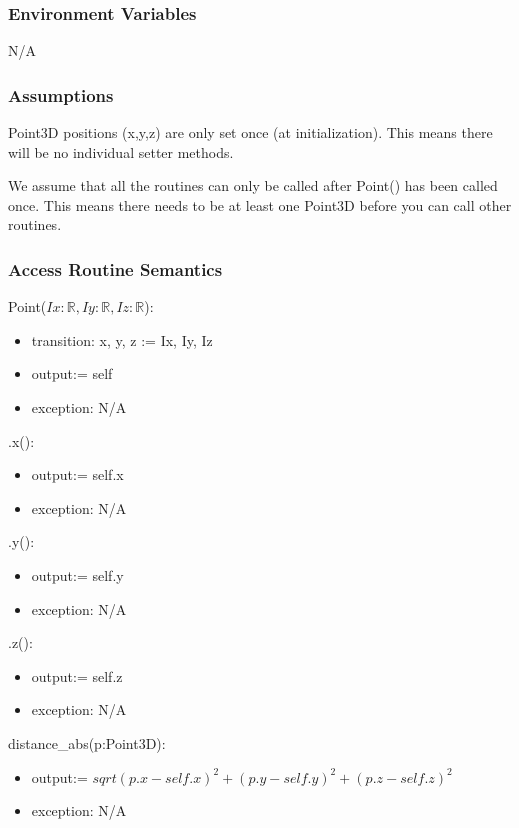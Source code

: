 \documentclass[12pt, titlepage]{article}
\begin{document}
\subsubsection{Environment Variables}
N/A

\subsubsection{Assumptions}
Point3D positions (x,y,z) are only set once (at initialization). This means 
there will be no individual setter methods.

We assume that all the routines can only be called after Point() has been 
called once. This means there needs to be at least one Point3D before you can 
call other routines.

\subsubsection{Access Routine Semantics}\label{mPoints-programs}
\noindent Point($Ix: \mathbb{R}, Iy: \mathbb{R}, Iz: \mathbb{R}$):
\begin{itemize}
	\item transition: x, y, z := Ix, Iy, Iz
	\item output:= self
	\item exception: N/A
\end{itemize}

\noindent .x():
\begin{itemize}
	\item output:= self.x
	\item exception: N/A
\end{itemize}

\noindent .y():
\begin{itemize}
	\item output:= self.y
	\item exception: N/A
\end{itemize}

\noindent .z():
\begin{itemize}
	\item output:= self.z
	\item exception: N/A
\end{itemize} 

\noindent distance\_abs(p:Point3D):
\begin{itemize}
	\item output:= $sqrt{(p.x-self.x)^2 + (p.y-self.y)^2 + (p.z-self.z)^2}$
	\item exception: N/A
\end{itemize} 
\end{document}
